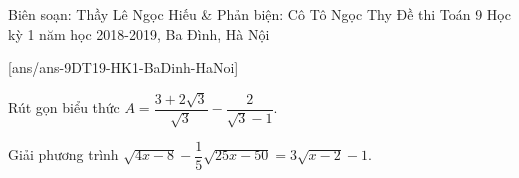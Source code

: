 \begin{name}
{Biên soạn: Thầy Lê Ngọc Hiếu \& Phản biện: Cô Tô Ngọc Thy }
{Đề thi Toán 9 Học kỳ 1 năm học 2018-2019, Ba Đình, Hà Nội}
\end{name}
\setcounter{bt}{0}
[ans/ans-9DT19-HK1-BaDinh-HaNoi]
\begin{bt}%
	Rút gọn biểu thức $A=\dfrac{3+2\sqrt{3}}{\sqrt{3}}-\dfrac{2}{\sqrt{3}-1}.$
\end{bt}

\begin{bt}%
	Giải phương trình $\sqrt{4x-8}-\dfrac{1}{5}\sqrt{25x-50}=3\sqrt{x-2}-1.$
\end{bt}

